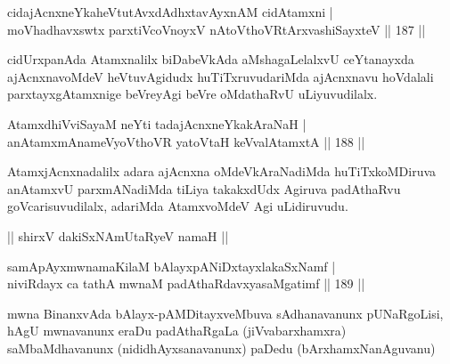 \begin{shl}
cidajAcnxneYkaheVtutAvxdAdhxtavAyxnAM cidAtamxni |\\
moVhadhavxswtx parxtiVcoV\s noyxV nAtoV\s thoVR\s tArxvashiSayxteV \hfill || 187 ||
\end{shl}

\begin{artha}
cidUrxpanAda Atamxnalilx biDabeVkAda aMshagaLelalxvU ceYtanayxda ajAcnxnavoMdeV heVtuvAgidudx huTiTxruvudariMda ajAcnxnavu hoVdalali parxtayxgAtamxnige beVreyAgi beVre oMdathaRvU uLiyuvudilalx.
\end{artha}


\begin{shl}
AtamxdhiVviSayaM neYti tadajAcnxneYkakAraNaH |\\
anAtamxmAnameVyoV\s thoVR yatoV\s taH keVvalAtamxtA \hfill || 188 ||
\end{shl}

\begin{artha}
AtamxjAcnxnadalilx adara ajAcnxna oMdeVkAraNadiMda huTiTxkoMDiruva anAtamxvU parxmANadiMda tiLiya takakxdUdx Agiruva padAthaRvu goVcarisuvudilalx, adariMda AtamxvoMdeV Agi uLidiruvudu.
\end{artha}



\begin{center}
|| shirxV dakiSxNAmUtaRyeV namaH ||
\end{center}


\begin{shl}
samApAyxmwnamaKilaM bAlayxpANiDxtayxlakaSxNamf |\\
niviRdayx ca tathA mwnaM padAthaRdavxyasaMgatimf \hfill || 189 ||
\end{shl}

\begin{artha}%
mwna BinanxvAda bAlayx-pAMDitayxveMbuva sAdhanavanunx pUNaRgoLisi, hAgU mwnavanunx eraDu padAthaRgaLa (jiVvabarxhamxra) saMbaMdhavanunx (nididhAyxsanavanunx) paDedu (bArxhamxNanAguvanu)
\end{artha}



